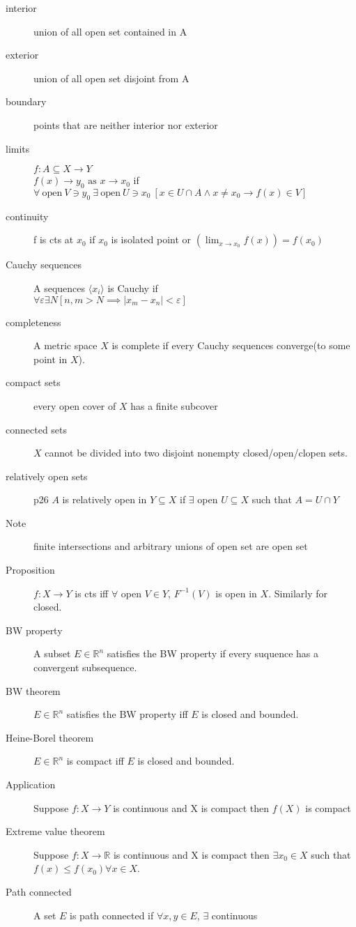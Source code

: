 \begin{description}
\item[interior]
	union of all open set contained in A
\item[exterior]
	union of all open set disjoint from A
\item[boundary]
	points that are neither interior nor exterior
\item[limits] $f:A\subseteq X\to Y$\hfill\\
$f(x)\to y_0 \textrm{ as } x\to x_0$ if
$\forall \ \mathrm{open} \ V\ni y_0 \ \exists \ \mathrm{open} \ U\ni x_0 
	\ [x\in U\cap A \wedge x\neq x_0 \to f(x)\in V]$
\item[continuity] f is cts at $x_0$ if $x_0$ is isolated point or $(\lim_{x\to x_0}f(x)) = f(x_0)$
\item[Cauchy sequences] A sequences $\langle x_i\rangle$ is Cauchy if\hfill\\
	$\forall \varepsilon \exists N [n,m>N\implies |x_m-x_n|<\varepsilon]$
\item[completeness]
	A metric space $X$ is complete if every Cauchy sequences converge(to some point in $X$).
\item[compact sets]
	every open cover of $X$ has a finite subcover
\item[connected sets]
	$X$ cannot be divided into two disjoint nonempty closed/open/clopen sets.
\item[relatively open sets] p26
	$A$ is relatively open in $Y\subseteq X$ if $\exists$ open $U\subseteq X$ such that $A=U\cap Y$
\item[Note] finite intersections and arbitrary unions of open set are open set
\item[Proposition] $f : X \to Y$ is cts iff $\forall$ open $ V \in Y$, $F^{-1}(V)$ is open in $X$. Similarly for closed.
\item[BW property] A subset $E \in \mathbb{R}^n$ satisfies the BW property if every suquence has a convergent subsequence.
\item[BW theorem] $E \in \mathbb{R}^n$ satisfies the BW property iff $E$ is closed and bounded.
\item[Heine-Borel theorem] $E \in \mathbb{R}^n$ is compact iff $E$ is closed and bounded.
\item[Application] Suppose $f:X \to Y$ is continuous and X is compact then $f(X)$ is compact
\item[Extreme value theorem] Suppose $f:X \to \mathbb{R}$ is continuous and X is compact then $\exists x_0 \in X$
such that $f(x) \leq f(x_0) \forall x \in X$.
\item[Path connected] A set $E$ is path connected if $\forall x, y \in E$, $\exists$ continuous

\end{description}
